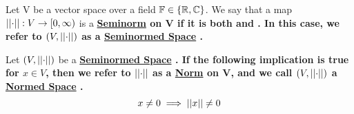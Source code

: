 \label{def:seminorm}
\newcommand{\Seminorm}[0]{
    \bf \hyperref[def:seminorm]{Seminorm} \rm
}
\label{def:seminormedspace}
\newcommand{\SeminormedSpace}[0]{
    \bf \hyperref[def:seminormedspace]{Seminormed Space} \rm
}
\begin{df}[Seminorm]
    Let V be a vector space over a field $\mathbb{F} \in \{ \mathbb{R}, \mathbb{C}\}$.  
    We say that a map $\left|\left| \cdot \right|\right|:V \to [0,\infty)$ is a \Seminorm on V if it is both \Subadditive and \ScalarHomogeneous. In this case, we refer to $(V, \left|\left| \cdot \right|\right|)$ as a \SeminormedSpace. 
\end{df} 





\label{def:norm}
\newcommand{\Norm}[0]{
    \bf \hyperref[def:norm]{Norm} \rm
}
\label{def:normedspace}
\newcommand{\NormedSpace}[0]{
    \bf \hyperref[def:normedspace]{Normed Space} \rm
}
\begin{df}[Norm]
    Let $(V,\left|\left| \cdot \right|\right|)$ be a \SeminormedSpace.
    If the following implication is true for $x \in V$, then we refer to $\left|\left| \cdot \right|\right|$ as a \Norm on V, and we call $(V, \left|\left| \cdot \right|\right|)$ a \NormedSpace.
    \begin{equation}
    x \neq 0 \implies \left|\left| x \right|\right| \neq 0
    \end{equation}
\end{df}
